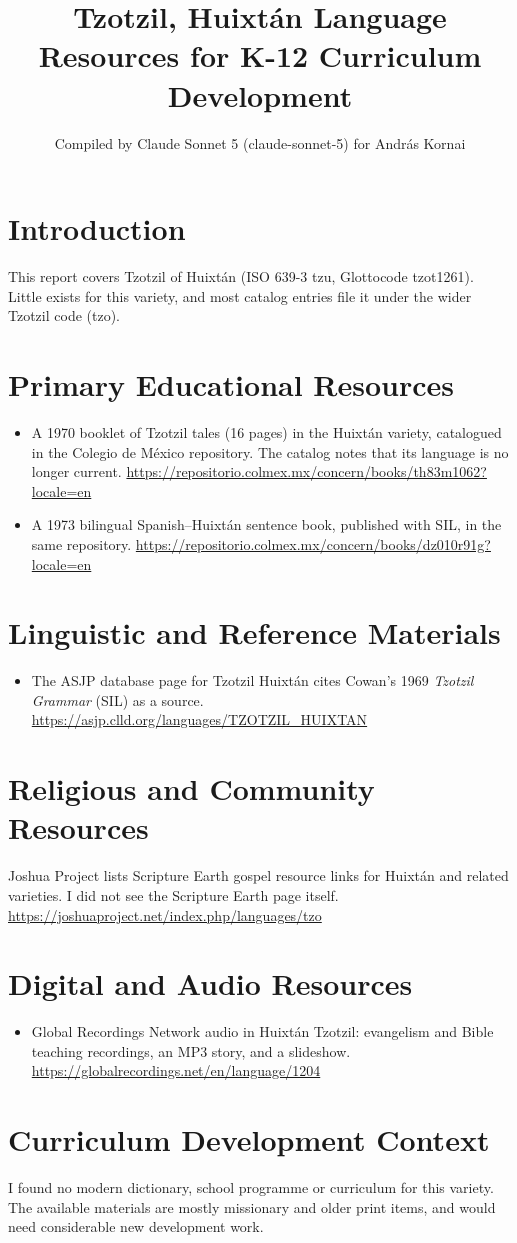 \documentclass[12pt]{article}
\title{Tzotzil, Huixt\'an Language Resources for K-12 Curriculum Development}
\author{Compiled by Claude Sonnet 5 (claude-sonnet-5) for Andr\'as Kornai}
\date{}
\begin{document}
\maketitle

\section{Introduction}
This report covers Tzotzil of Huixt\'an (ISO 639-3 tzu, Glottocode tzot1261). Little exists for this variety, and most catalog entries file it under the wider Tzotzil code (tzo).

\section{Primary Educational Resources}
\begin{itemize}
\item A 1970 booklet of Tzotzil tales (16 pages) in the Huixt\'an variety, catalogued in the Colegio de M\'exico repository. The catalog notes that its language is no longer current. \url{https://repositorio.colmex.mx/concern/books/th83m1062?locale=en}
\item A 1973 bilingual Spanish--Huixt\'an sentence book, published with SIL, in the same repository. \url{https://repositorio.colmex.mx/concern/books/dz010r91g?locale=en}
\end{itemize}

\section{Linguistic and Reference Materials}
\begin{itemize}
\item The ASJP database page for Tzotzil Huixt\'an cites Cowan's 1969 \emph{Tzotzil Grammar} (SIL) as a source. \url{https://asjp.clld.org/languages/TZOTZIL_HUIXTAN}
\end{itemize}

\section{Religious and Community Resources}
Joshua Project lists Scripture Earth gospel resource links for Huixt\'an and related varieties. I did not see the Scripture Earth page itself. \url{https://joshuaproject.net/index.php/languages/tzo}

\section{Digital and Audio Resources}
\begin{itemize}
\item Global Recordings Network audio in Huixt\'an Tzotzil: evangelism and Bible teaching recordings, an MP3 story, and a slideshow. \url{https://globalrecordings.net/en/language/1204}
\end{itemize}

\section{Curriculum Development Context}
I found no modern dictionary, school programme or curriculum for this variety. The available materials are mostly missionary and older print items, and would need considerable new development work.
\end{document}
